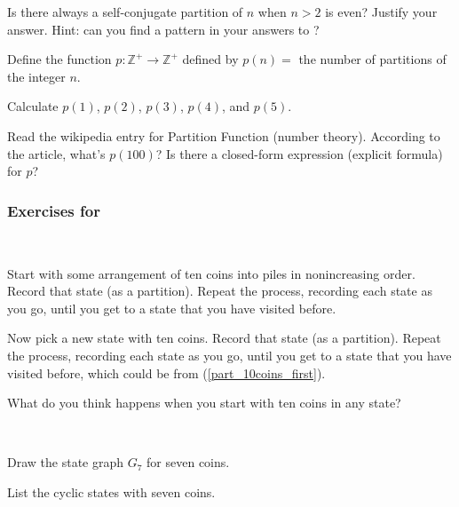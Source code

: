 \begin{exer}[\exerE] %
\label{exer_even_selfconj_always}
    Is there always a self-conjugate partition of $n$ when $n>2$ is even?  Justify your answer. Hint: can you find a pattern in your answers to ?
\end{exer}

\begin{exer}[\exerE] %
\label{exer_partition_function}
    Define the function $p:\mathbb{Z}^+ \to \mathbb{Z}^+$ defined by $p(n) =$ the number of partitions of the integer $n$.
        \begin{exerpart}
            \item Calculate $p(1)$, $p(2)$, $p(3)$, $p(4)$, and $p(5)$.
            \item Read the wikipedia entry for Partition Function (number theory).  According to the article, what's $p(100)$?  Is there a closed-form expression (explicit formula) for $p$?
        \end{exerpart}  
\end{exer}


\subsubsection*{Exercises for 
\subbulgsol}

\begin{exer}[\exerP] %
\label{exer_bulg_sol_10coins}
~
    \begin{exerpart}
        \item \label{part_10coins_first} Start with some arrangement of ten coins into piles in nonincreasing order.  Record that state (as a partition).  Repeat the process, recording each state as you go, until you get to a state that you have visited before.  
        \item Now pick a new state with ten coins. Record that state (as a partition).  Repeat the process, recording each state as you go, until you get to a state that you have visited before, which could be from (\ref{part_10coins_first}). 
        \item What do you think happens when you start with ten coins in any state?
    \end{exerpart}
\end{exer}

\begin{exer}[\exerP] %
\label{exer_bulg_sol_7coins_graph}
~
    \begin{exerpart}
        \item Draw the state graph $G_7$ for seven coins.
        \item List the cyclic states with seven coins.
    \end{exerpart}   
\end{exer}

